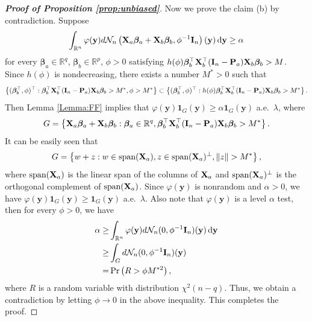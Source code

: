 \documentclass[11pt]{article}
\newcommand{\By}{\mathbf{y}}    \newcommand{\Bz}{\mathbf{z}}
\newcommand{\bfsym}[1]{\ensuremath{\boldsymbol{#1}}}
\def\bbeta{\bfsym \beta}
\theoremstyle{plain}
\theoremstyle{definition}
\theoremstyle{remark}
\begin{document}
\begin{proof}[\textbf{Proof of Proposition \ref{prop:unbiased}}]
    Now we prove the claim (b) by contradiction.
    Suppose
    \begin{equation*}
        \int_{\mathbb R^n} \varphi(\By) d\mathcal N_n \left(\BX_a \bbeta_a + \BX_b \bbeta_b,\phi^{-1} \BI_n\right) (\By)\, \mathrm{d}\By 
        \geq \alpha 
    \end{equation*}
    for every $\bbeta_a\in \mathbb R^q$, $\bbeta_b \in \mathbb R^p$, $\phi>0$ satisfying $h(\phi) \bbeta_b^\top \BX_b^\top (\BI_n - \BP_a) \BX_b \bbeta_b >M$.
    Since $h(\phi)$ is nondecreasing, there exists a number $M^* >0$ such that
    \begin{equation*}
        \left\{(\bbeta_b^\top, \phi)^\top :  \bbeta_b^\top \BX_b^\top (\BI_n - \BP_a) \BX_b \bbeta_b >M^*,\phi>M^* \right\} 
        \subset
        \left\{(\bbeta_b^\top, \phi)^\top :  h(\phi)\bbeta_b^\top \BX_b^\top (\BI_n - \BP_a) \BX_b \bbeta_b > M^*\right\} .
    \end{equation*}
    Then Lemma \ref{Lemma:FF} implies that $\varphi(\By) \mathbf 1_{G}(\By)\geq \alpha \mathbf 1_{G}(\By)$ a.e.\ $\lambda$, where 
    \begin{equation*}
        G=\left\{ \BX_a \bbeta_a + \BX_b \bbeta_b:  \bbeta_a \in \mathbb R^{q},
        \bbeta_b^\top \BX_b^\top (\BI_n - \BP_a) \BX_b \bbeta_b >M^*
    \right\}.
    \end{equation*}
    It can be easily seen that
    \begin{equation*}
        G=\left\{
            w+z: w\in \textrm{span}(\mathbf{X}_a), z \in \textrm{span}(\mathbf{X}_a)^{\bot},
            \|z\| > M^*
        \right\},
    \end{equation*}
    where $\textrm{span}(\mathbf{X}_a)$ is the linear span of the columns of $\mathbf{X}_a$ and $\textrm{span}(\mathbf{X}_a)^\bot$ is the orthogonal complement of $\textrm{span}(\mathbf{X}_a)$.
    Since $\varphi(\By)$ is nonrandom and $\alpha>0$, we have $\varphi(\By) \mathbf 1_{G}(\By)\geq \mathbf 1_{G}(\By)$ a.e.\ $\lambda$.
    Also note that $\varphi(\By)$ is a level $\alpha$ test, then for every $\phi>0$, we have
    \begin{equation*}
        \begin{split}
            \alpha \geq&
        \int_{\mathbb R^n} \varphi(\By) d\mathcal N_n (0,\phi^{-1} \BI_n)(\By) \,\mathrm{d} \By
        \\
        \geq& 
        \int_{G} d\mathcal N_n (0,\phi^{-1} \BI_n)(\By) 
        \\
        =&\Pr\left( 
            R > \phi M^{*2}
        \right),
        \end{split}
    \end{equation*}
    where $R$ is a random variable with distribution $\chi^2(n-q)$.
    Thus, we obtain a contradiction by letting $\phi\to 0$ in the above inequality.
    This completes the proof.

\end{proof}
\end{document}
